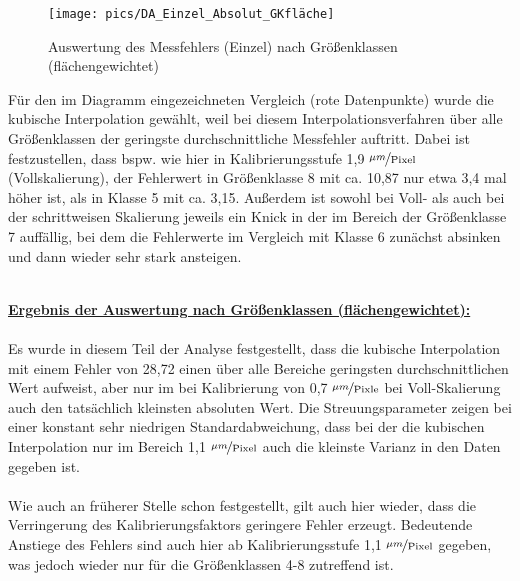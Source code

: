 \documentclass[
fontsize=10pt, 
listof = totoc,
parskip = half	
]{report}
\begin{document}
\begin{figure}[H]
	\centering
	\texttt{[image: pics/DA\_Einzel\_Absolut\_GKfläche]}
	\caption{Auswertung des Messfehlers (Einzel) nach Größenklassen (flächengewichtet)}
	\label{fig:DAEinzelAbsolutGKflaeche}
\end{figure}

\noindent Für den im Diagramm eingezeichneten Vergleich (rote Datenpunkte) wurde die kubische Interpolation gewählt, weil bei diesem Interpolationsverfahren über alle Größenklassen der geringste durchschnittliche Messfehler auftritt. Dabei ist festzustellen, dass bspw. wie hier in Kalibrierungsstufe 1,9 $\nicefrac{\mu m}{\text{Pixel}}$ (Vollskalierung), der Fehlerwert in Größenklasse 8 mit ca. 10,87 nur etwa 3,4 mal höher ist, als in Klasse 5 mit ca. 3,15. Außerdem ist sowohl bei Voll- als auch bei der schrittweisen Skalierung jeweils ein Knick in der im Bereich der Größenklasse 7 auffällig, bei dem die Fehlerwerte im Vergleich mit Klasse 6 zunächst absinken und dann wieder sehr stark ansteigen. 
\\\\
\colorbox{gray!10}{
	\label{box:Ergebnis der Auswertung nach Größenklassen (flächengewichtet):}
	\begin{minipage}{0.975\textwidth}
		\textbf{\underline{Ergebnis der Auswertung nach Größenklassen (flächengewichtet):}}
		\\\\
		Es wurde in diesem Teil der Analyse festgestellt, dass die kubische Interpolation mit einem  Fehler von 28,72 einen über alle Bereiche geringsten durchschnittlichen Wert aufweist, aber nur im bei Kalibrierung von 0,7 $\nicefrac{\mu m}{\text{Pixle}}$ bei Voll-Skalierung auch den tatsächlich kleinsten absoluten Wert. Die Streuungsparameter zeigen bei einer konstant sehr niedrigen Standardabweichung, dass bei der die kubischen Interpolation nur im Bereich 1,1 $\nicefrac{\mu m}{\text{Pixel}}$ auch die kleinste Varianz in den Daten gegeben ist.
		\\\\
		Wie auch an früherer Stelle schon festgestellt, gilt auch hier wieder, dass die Verringerung des Kalibrierungsfaktors geringere Fehler erzeugt. Bedeutende Anstiege des Fehlers sind auch hier ab Kalibrierungsstufe 1,1 $\nicefrac{\mu m}{\text{Pixel}}$ gegeben, was jedoch wieder nur für die Größenklassen 4-8 zutreffend ist.
	\end{minipage}
}
	
\end{document}
